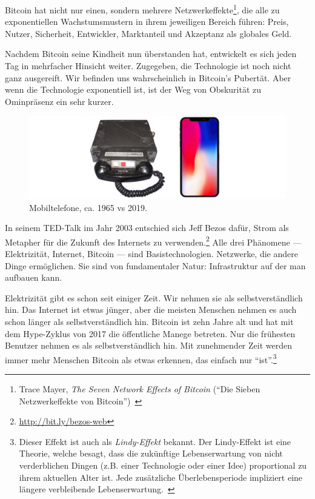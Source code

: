 Bitcoin hat nicht nur einen, sondern mehrere Netzwerkeffekte\footnote{Trace
Mayer, \textit{The Seven Network Effects of Bitcoin} (\enquote{Die Sieben
Netzwerkeffekte von Bitcoin})~\cite{7-network-effects}}, die alle zu
exponentiellen Wachstumsmustern in ihrem jeweiligen Bereich führen: Preis,
Nutzer, Sicherheit, Entwickler, Marktanteil und Akzeptanz als globales Geld.

Nachdem Bitcoin seine Kindheit nun überstanden hat, entwickelt es sich jeden Tag
in mehrfacher Hinsicht weiter. Zugegeben, die Technologie ist noch nicht ganz
ausgereift. Wir befinden uns wahrscheinlich in Bitcoin's Pubertät. Aber wenn die
Technologie exponentiell ist, ist der Weg von Obskurität zu Ominpräsenz ein sehr
kurzer.

\begin{figure}
  \includegraphics[width=\textwidth]{assets/images/mobile-phone.png}
  \caption{Mobiltelefone, ca. 1965 vs 2019.}
  \label{fig:mobile-phone}
\end{figure}

In seinem TED-Talk im Jahr 2003 entschied sich Jeff Bezos dafür, Strom als
Metapher für die Zukunft des Internets zu
verwenden.\footnote{\url{http://bit.ly/bezos-web}} Alle drei Phänomene ---
Elektrizität, Internet, Bitcoin --- sind Basistechnologien. Netzwerke, die
andere Dinge ermöglichen. Sie sind von fundamentaler Natur: Infrastruktur auf
der man aufbauen kann.

Elektrizität gibt es schon seit einiger Zeit. Wir nehmen sie als
selbstverständlich hin. Das Internet ist etwas jünger, aber die meisten Menschen
nehmen es auch schon länger als selbstverständlich hin. Bitcoin ist zehn Jahre
alt und hat mit dem Hype-Zyklus von 2017 die öffentliche Manege betreten. Nur
die frühesten Benutzer nehmen es als selbstverständlich hin. Mit zunehmender
Zeit werden immer mehr Menschen Bitcoin als etwas erkennen, das einfach nur
\enquote{ist}.\footnote{Dieser Effekt ist auch als \textit{Lindy-Effekt}
bekannt. Der Lindy-Effekt ist eine Theorie, welche besagt, dass die zukünftige
Lebenserwartung von nicht verderblichen Dingen (z.B. einer Technologie oder einer
Idee) proportional zu ihrem aktuellen Alter ist. Jede zusätzliche
Überlebensperiode impliziert eine längere verbleibende
Lebenserwartung.~\cite{wiki:lindy}}

